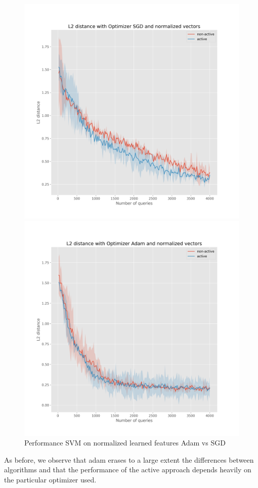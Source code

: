 \documentclass{article}
\begin{document}
\begin{figure}[t]
  \centering
  \begin{minipage}{.45\textwidth}
    \centering
    \includegraphics[width=\linewidth]{active-vs-base-moons-l2-loss-SGD-normalized-ci}
  \end{minipage}%
  \begin{minipage}{.45\textwidth}
    \centering
    \includegraphics[width=\linewidth]{active-vs-base-moons-l2-loss-Adam-normalized-ci}
  \end{minipage}
  \caption{Performance SVM on normalized learned features Adam vs SGD}\label{fig:l2-loss-normalized-ci}
\end{figure}
As before, we observe that adam erases to a large extent the differences between algorithms and that the performance
of the active approach depends heavily on the particular optimizer used.
\end{document}
